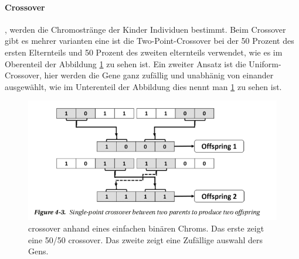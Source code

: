 \paragraph{Crossover}, werden die Chromostränge der Kinder Individuen bestimmt. Beim Crossover gibt es mehrer varianten eine ist die Two-Point-Crossover bei der 50 Prozent des ersten Elternteils und 50 Prozent des zweiten elternteils verwendet, wie es im Oberenteil der Abbildung \ref{fig:chromoson_crossover} zu sehen ist. Ein zweiter Ansatz ist die Uniform-Crossover, hier werden die Gene ganz zufällig und unabhänig von einander ausgewählt, wie im Unterenteil der Abbildung dies nennt man  \ref{fig:chromoson_crossover} zu sehen ist. 

\begin{figure}[H]
  \centering  
  \includegraphics[scale=0.5]{img/crossover.png}
  \caption{crossover anhand eines einfachen binären Chroms. Das erste zeigt eine 50/50 crossover. Das zweite zeigt eine Zufällige auswahl ders Gens.\cite{Rashid2017} }
  \label{fig:chromoson_crossover}
\end{figure}

